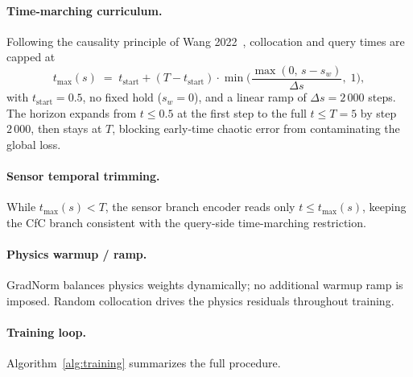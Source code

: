 \paragraph{Time-marching curriculum.}
Following the causality principle of Wang 2022~\cite{wang2022respectingcausality}, collocation and query times are capped at
\begin{equation*}
    t_{\max}(s) \;=\; t_{\text{start}} + (T - t_{\text{start}})\cdot\min\!\Big(\frac{\max(0,\,s-s_w)}{\Delta s},\;1\Big),
\end{equation*}
with $t_{\text{start}}=0.5$, no fixed hold ($s_w = 0$), and a linear ramp of $\Delta s = 2\,000$ steps. The horizon expands from $t \le 0.5$ at the first step to the full $t \le T = 5$ by step $2\,000$, then stays at $T$, blocking early-time chaotic error from contaminating the global loss.

\paragraph{Sensor temporal trimming.}
While $t_{\max}(s) < T$, the sensor branch encoder reads only $t \le t_{\max}(s)$, keeping the CfC branch consistent with the query-side time-marching restriction.

\paragraph{Physics warmup / ramp.}
GradNorm balances physics weights dynamically; no additional warmup ramp is imposed. Random collocation drives the physics residuals throughout training.

\paragraph{Training loop.}
Algorithm~\ref{alg:training} summarizes the full procedure.

